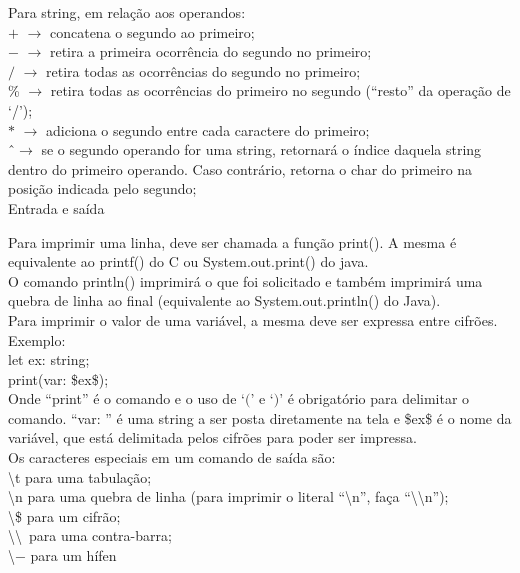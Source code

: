 \documentclass[12pt,a4paper]{article}
\begin{document}
Para string, em relação aos operandos:\\[0.15cm]
$+$ $\rightarrow$ concatena o segundo ao primeiro;\\
$-$ $\rightarrow$ retira a primeira ocorrência do segundo no primeiro;\\
$/$ $\rightarrow$ retira todas as ocorrências do segundo no primeiro;\\
\% $\rightarrow$ retira todas as ocorrências do primeiro no segundo (``resto'' da operação de `/');\\
$*$ $\rightarrow$ adiciona o segundo entre cada caractere do primeiro;\\
\^ \ $\rightarrow$ se o segundo operando for uma string, retornará o índice daquela string dentro do primeiro operando. Caso contrário, retorna o char do primeiro na posição indicada pelo segundo;\\

\hypertarget{label1}{\Large{Entrada e saída}}\\[0.3cm]
\normalsize

Para imprimir uma linha, deve ser chamada a função print(). A mesma é equivalente ao printf() do C ou System.out.print() do java.\\
O comando println() imprimirá o que foi solicitado e também imprimirá uma quebra de linha ao final (equivalente ao System.out.println() do Java).\\

Para imprimir o valor de uma variável, a mesma deve ser expressa entre cifrões. Exemplo: \\

let ex: string;\\

print(var: \$ex\$); \\

Onde ``print'' é o comando e o uso de `$($' e `$)$' é obrigatório para delimitar o comando. ``var: '' é uma string a ser posta diretamente na tela e \$ex\$ é o nome da variável, que está delimitada pelos cifrões para poder ser impressa.\\

Os caracteres especiais em um comando de saída são:\\[0.2cm]
\textbackslash t para uma tabulação; \\
\textbackslash n para uma quebra de linha (para imprimir o literal ``\textbackslash n'', faça ``\textbackslash \textbackslash n'');\\
\textbackslash \$ para um cifrão; \\
\textbackslash \textbackslash\ para uma contra-barra; \\
\textbackslash $-$ para um hífen\\
\end{document}
